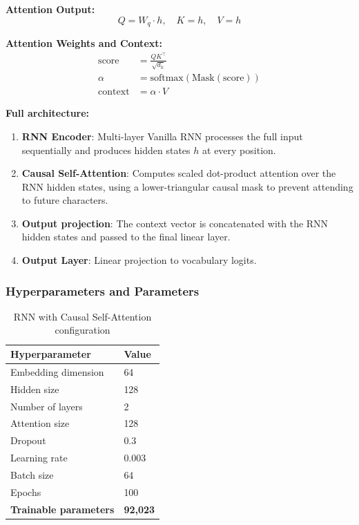 \documentclass[11pt,a4paper]{article}
\begin{document}
\textbf{Attention Output:}
\begin{equation}
Q = W_q \cdot h, \quad K = h, \quad V = h
\end{equation}

\textbf{Attention Weights and Context:}
\begin{align}
\text{score} &= \frac{Q K^\top}{\sqrt{d_k}} \\
\alpha &= \text{softmax}(\text{Mask}(\text{score})) \\
\text{context} &= \alpha \cdot V
\end{align}

\textbf{Full architecture:}
\begin{enumerate}[noitemsep]
    \item \textbf{RNN Encoder}: Multi-layer Vanilla RNN processes the full input sequentially and produces hidden states $h$ at every position.
    \item \textbf{Causal Self-Attention}: Computes scaled dot-product attention over the RNN hidden states, using a lower-triangular causal mask to prevent attending to future characters.
    \item \textbf{Output projection}: The context vector is concatenated with the RNN hidden states and passed to the final linear layer.
    \item \textbf{Output Layer}: Linear projection to vocabulary logits.
\end{enumerate}

\subsubsection{Hyperparameters and Parameters}
\begin{table}[H]
\centering
\caption{RNN with Causal Self-Attention configuration}
\renewcommand{\arraystretch}{1.3}
\begin{tabularx}{\textwidth}{lX}
\toprule
\textbf{Hyperparameter} & \textbf{Value} \\
\midrule
Embedding dimension & 64 \\
Hidden size & 128 \\
Number of layers & 2 \\
Attention size & 128 \\
Dropout & 0.3 \\
Learning rate & 0.003 \\
Batch size & 64 \\
Epochs & 100 \\
\midrule
\textbf{Trainable parameters} & \textbf{92,023} \\
\bottomrule
\end{tabularx}
\end{table}
\end{document}

